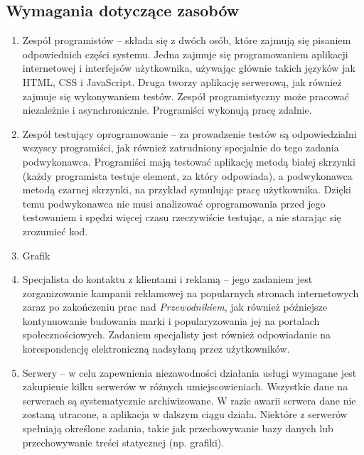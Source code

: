 \documentclass[12pt,a4paper]{report}
\begin{document}
\subsection{Wymagania dotyczące zasobów}
\begin{enumerate}
	\item Zespół programistów -- składa się z dwóch osób, które zajmują się pisaniem odpowiednich części systemu. Jedna zajmuje się programowaniem aplikacji internetowej i interfejsów użytkownika, używając głównie takich języków jak HTML, CSS i JavaScript. Druga tworzy aplikację serwerową, jak również zajmuje się wykonywaniem testów. Zespół programistyczny może pracować niezależnie i asynchronicznie. Programiści wykonują pracę zdalnie. 
	\item Zespół testujący oprogramowanie -- za prowadzenie testów są odpowiedzialni wszyscy programiści, jak również zatrudniony specjalnie do tego zadania podwykonawca. Programiści mają testować aplikację metodą białej skrzynki (każdy programista testuje element, za który odpowiada), a podwykonawca metodą czarnej skrzynki, na przykład symulując pracę użytkownika. Dzięki temu podwykonawca nie musi analizować oprogramowania przed jego testowaniem i spędzi więcej czasu rzeczywiście testując, a nie starając się zrozumieć kod.
	\item Grafik
	\item Specjalista do kontaktu z klientami i reklamą -- jego zadaniem jest zorganizowanie kampanii reklamowej na popularnych stronach internetowych zaraz po zakończeniu prac nad \emph{Przewodnikiem}, jak również późniejsze kontynuowanie budowania marki i popularyzowania jej na portalach społecznościowych. Zadaniem specjalisty jest również odpowiadanie na korespondencję elektroniczną nadsyłaną przez użytkowników.
	\item Serwery -- w celu zapewnienia niezawodności działania usługi wymagane jest zakupienie kilku serwerów w różnych umiejscowieniach. Wszystkie dane na serwerach są systematycznie archiwizowane. W razie awarii serwera dane nie zostaną utracone, a aplikacja w dalszym ciągu działa. Niektóre z serwerów spełniają określone zadania, takie jak przechowywanie bazy danych lub przechowywanie treści statycznej (np. grafiki). 
\end{enumerate}
\newpage
\end{document}
